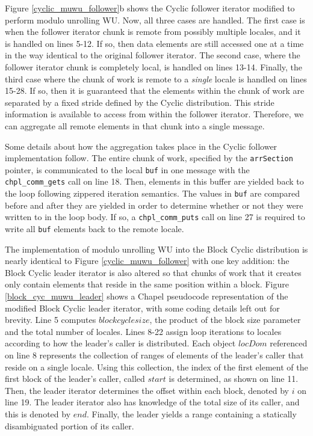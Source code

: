 Figure \ref{cyclic_muwu_follower}b shows the Cyclic follower iterator modified to perform modulo unrolling WU. Now, all three cases are handled. The first case is when the follower iterator chunk is remote from possibly multiple locales, and it is handled on lines 5-12. If so, then data elements are still accessed one at a time in the way identical to the original follower iterator. The second case, where the follower iterator chunk is completely local, is handled on lines 13-14. Finally, the third case where the chunk of work is remote to a \textit{single} locale is handled on lines 15-28. If so, then it is guaranteed that the elements within the chunk of work are separated by a fixed stride defined by the Cyclic distribution. This stride information is available to access from within the follower iterator. Therefore, we can aggregate all remote elements in that chunk into a single message.

Some details about how the aggregation takes place in the Cyclic follower implementation follow. The entire chunk of work, specified by the \texttt{arrSection} pointer, is communicated to the local \texttt{buf} in one message with the \texttt{chpl\_comm\_gets} call on line 18. Then, elements in this buffer are yielded back to the loop following zippered iteration semantics. The values in \texttt{buf} are compared before and after they are yielded in order to determine whether or not they were written to in the loop body. If so, a \texttt{chpl\_comm\_puts} call on line 27 is required to write all \texttt{buf} elements back to the remote locale.

The implementation of modulo unrolling WU into the Block Cyclic distribution is nearly identical to Figure \ref{cyclic_muwu_follower} with one key addition: the Block Cyclic leader iterator is also altered so that chunks of work that it creates only contain elements that reside in the same position within a block. 
Figure \ref{block_cyc_muwu_leader} shows a Chapel pseudocode representation of the modified Block Cyclic leader iterator, with some coding details left out for brevity. Line 5 computes $blockcyclesize$, the product of the block size parameter and the total number of locales. Lines 8-22 assign loop iterations to locales according to how the leader's caller is distributed. Each object $locDom$ referenced on line 8 represents the collection of ranges of elements of the leader's caller that reside on a single locale. Using this collection, the index of the first element of the first block of the leader's caller, called $start$ is determined, as shown on line 11. Then, the leader iterator determines the offset within each block, denoted by $i$ on line 19. The leader iterator also has knowledge of the total size of its caller, and this is denoted by $end$. Finally, the leader yields a range containing a statically disambiguated portion of its caller. 

